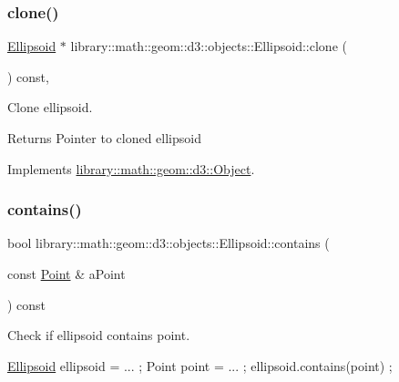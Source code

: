\subsubsection{\texorpdfstring{clone()}{clone()}}
{\footnotesize\ttfamily \hyperlink{classlibrary_1_1math_1_1geom_1_1d3_1_1objects_1_1_ellipsoid}{Ellipsoid} $\ast$ library\+::math\+::geom\+::d3\+::objects\+::\+Ellipsoid\+::clone (\begin{DoxyParamCaption}{ }\end{DoxyParamCaption}) const\hspace{0.3cm}{\ttfamily [override]}, {\ttfamily [virtual]}}



Clone ellipsoid. 

\begin{DoxyReturn}{Returns}
Pointer to cloned ellipsoid 
\end{DoxyReturn}


Implements \hyperlink{classlibrary_1_1math_1_1geom_1_1d3_1_1_object_a1a784c6b359e0eb97cd34fabc42f2f3f}{library\+::math\+::geom\+::d3\+::\+Object}.

\mbox{\label{classlibrary_1_1math_1_1geom_1_1d3_1_1objects_1_1_ellipsoid_ae54cb74c4e6445988ac4d78e00288dd2}} 
\subsubsection{\texorpdfstring{contains()}{contains()}\hspace{0.1cm}{\footnotesize\ttfamily [1/2]}}
{\footnotesize\ttfamily bool library\+::math\+::geom\+::d3\+::objects\+::\+Ellipsoid\+::contains (\begin{DoxyParamCaption}\item[{const \hyperlink{classlibrary_1_1math_1_1geom_1_1d3_1_1objects_1_1_point}{Point} \&}]{a\+Point }\end{DoxyParamCaption}) const}



Check if ellipsoid contains point. 


\begin{DoxyCode}
\hyperlink{classlibrary_1_1math_1_1geom_1_1d3_1_1objects_1_1_ellipsoid_aae81fe0edc7f0e8d4590ea89ae73cb14}{Ellipsoid} ellipsoid = ... ;
Point point = ... ;
ellipsoid.contains(point) ;
\end{DoxyCode}



